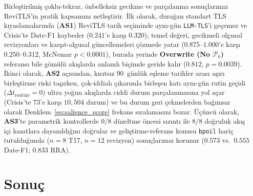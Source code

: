 ﻿\documentclass[journal]{IEEEtran}
\begin{document}
Birle\c{s}tirilmi\c{s} \c{c}oklu-tekrar, \"{o}nbelleksiz gecikme ve par\c{c}alanma sonu\c{c}lar{\i}m{\i}z ReviTLS'in pratik kapsam{\i}n{\i} netle\c{s}tirir. \.{I}lk olarak, dura\u{g}an standart TLS k{\i}yaslamalar{\i}nda (\textbf{AS1}) ReviTLS tarih se\c{c}iminde ayn{\i}-g\"{u}n \texttt{LLM-TLS}'i ge\c{c}emez ve Crisis'te $\text{Date-F1}$ kaybeder ($0.241$'e kar\c{s}{\i} $0.320$); temel de\u{g}eri, gecikmeli olgusal revizyonlar{\i} ve kar\c{s}{\i}t-olgusal g\"{u}ncellemeleri \c{c}\"{o}zmede yatar ($0.875\text{--}1.000$'e kar\c{s}{\i} $0.250\text{--}0.312$, McNemar $p < 0.0001$), burada yerinde \textbf{Overwrite (No $\mathcal{P}_k$)} referans{\i} bile g\"{o}m\"{u}l\"{u} ak{\i}\c{s}larda anlaml{\i} bi\c{c}imde geride kal{\i}r ($0.812$, $p = 0.0039$). \.{I}kinci olarak, \textbf{AS2} a\c{c}{\i}s{\i}ndan, k{\i}s{\i}ts{\i}z $90$~g\"{u}nl\"{u}k e\c{s}leme tarihler aras{\i} a\c{s}{\i}r{\i} birle\c{s}tirme riski ta\c{s}{\i}rken, \c{c}ok-iddial{\i} \c{c}{\i}kar{\i}mla birle\c{s}en kat{\i} ayn{\i}-g\"{u}n rutin ge\c{c}idi ($\Delta t_{\text{routine}}=0$) ultra yo\u{g}un ak{\i}\c{s}larda ciddi durum par\c{c}alanmas{\i}na yol a\c{c}ar (Crisis'te $73$'e kar\c{s}{\i} $10{,}504$ durum) ve bu durum geri \c{c}ekmelerden ba\u{g}{\i}ms{\i}z olarak Denklem~\eqref{eq:salience_score} frekans s{\i}ralamas{\i}n{\i} bozar. \"{U}\c{c}\"{u}nc\"{u} olarak, \textbf{AS3}'te parametrik kontrollerde $0/8$ d\"{u}zeltme \"{o}ncesi s{\i}z{\i}nt{\i} ile $8/8$ do\u{g}ruluk ak{\i}\c{s} i\c{c}i kan{\i}tlara dayan{\i}ld{\i}\u{g}{\i}n{\i} do\u{g}rular ve geli\c{s}tirme-referans konusu \texttt{bpoil} hari\c{c} tutuldu\u{g}unda ($n=8$ T17, $n=12$ revizyon) sonu\c{c}lar{\i}m{\i}z korunur ($0.573$ vs.\ $0.555$ Date-F1; $0.833$ RRA).

\section{Sonu\c{c}}
\label{sec:conclusion}
\end{document}
